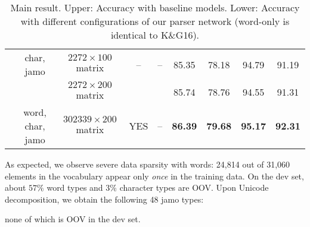 \documentclass[11pt,letterpaper]{article}
\newcommand{\by}{\ensuremath{\times}}
\begin{document}
\begin{CJK}{UTF8}{gbsn}
\begin{table*}[t!]
\begin{center}
{\begin{tabular}{|c|c|c|c|c|c|c|c|c|}
              &    char, jamo  &      $2272 \by 100$  matrix   & --  &  --    &  85.35	 & 78.18        & 94.79   & 91.19 \\
              &                &      $2272 \by 200$  matrix   &     &        &  85.74	 & 78.76        & 94.55   & 91.31 \\
              & word, char, jamo  &      $302339 \by 200$  matrix & YES &  --    & \textbf{86.39}      & \textbf{79.68}        & \textbf{95.17}   & \textbf{92.31} \\
\hline
\end{tabular}
\caption{Main result. Upper: Accuracy with baseline models. Lower: Accuracy with different configurations of our parser network (word-only is identical to K\&G16).}
\label{tab:result}
}
\end{center}
\vspace{-3mm}
\end{table*}


As expected, we observe severe data sparsity with words: 24,814 out of 31,060 elements in the vocabulary appear only \textit{once} in the training data.
On the dev set, about $57\%$ word types and $3\%$ character types are OOV.
Upon Unicode decomposition, we obtain the following 48 jamo types:

\vspace{1mm}
\begin{center}
{%
{}
}
\end{center}
\vspace{1mm}

\noindent
none of which is OOV in the dev set.


\end{CJK}
\end{document}
